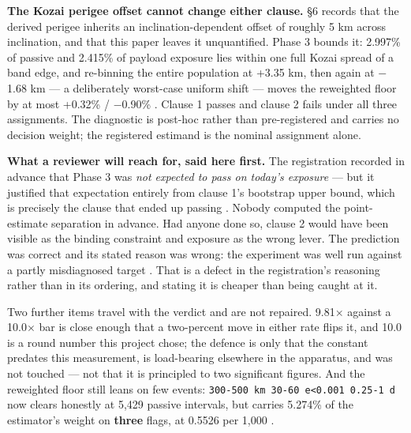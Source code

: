 \documentclass[11pt]{article}
\begin{document}

\textbf{The Kozai perigee offset cannot change either clause.} \S{}6 records that the derived perigee inherits an inclination-dependent offset of roughly 5 km across inclination, and that this paper leaves it unquantified. Phase 3 bounds it: 2.997\% of passive and 2.415\% of payload exposure lies within one full Kozai spread of a band edge, and re-binning the entire population at +3.35 km, then again at $-$1.68 km --- a deliberately worst-case uniform shift --- moves the reweighted floor by at most +0.32\% / $-$0.90\%%
. Clause 1 passes and clause 2 fails under all three assignments. The diagnostic is post-hoc rather than pre-registered and carries no decision weight; the registered estimand is the nominal assignment alone.

\textbf{What a reviewer will reach for, said here first.} The registration recorded in advance that Phase 3 was \emph{not expected to pass on today's exposure} --- but it justified that expectation entirely from clause 1's bootstrap upper bound, which is precisely the clause that ended up passing%
. Nobody computed the point-estimate separation in advance. Had anyone done so, clause 2 would have been visible as the binding constraint and exposure as the wrong lever. The prediction was correct and its stated reason was wrong: the experiment was well run against a partly misdiagnosed target%
. That is a defect in the registration's reasoning rather than in its ordering, and stating it is cheaper than being caught at it.

Two further items travel with the verdict and are not repaired. 9.81$\times$ against a 10.0$\times$ bar is close enough that a two-percent move in either rate flips it, and 10.0 is a round number this project chose; the defence is only that the constant predates this measurement, is load-bearing elsewhere in the apparatus, and was not touched --- not that it is principled to two significant figures. And the reweighted floor still leans on few events: \texttt{300-500 km \textbar{} 30-60\textdegree{} \textbar{} e\textless{}0.001 \textbar{} 0.25-1 d} now clears  honestly at 5,429 passive intervals, but carries 5.274\% of the estimator's weight on \textbf{three} flags, at 0.5526 per 1,000%
.
\end{document}
